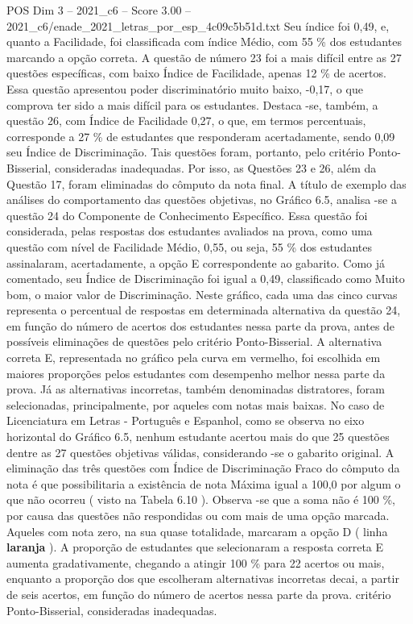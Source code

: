\begin{textsample}{POS Dim 3 – 2021\_c6 – Score 3.00 – 2021\_c6/enade\_2021\_letras\_por\_esp\_4c09c5b51d.txt}
Seu índice foi 0,49, e, quanto a Facilidade, foi classificada com índice Médio, com 55 \% dos estudantes marcando a opção correta.
A questão de número 23 foi a mais difícil entre as 27 questões específicas, com baixo Índice de Facilidade, apenas 12 \% de acertos.
Essa questão apresentou poder discriminatório muito baixo, -0,17, o que comprova ter sido a mais difícil para os estudantes.
Destaca -se, também, a questão 26, com Índice de Facilidade 0,27, o que, em termos percentuais, corresponde a 27 \% de estudantes que responderam acertadamente, sendo 0,09 seu Índice de Discriminação.
Tais questões foram, portanto, pelo critério Ponto-Bisserial, consideradas inadequadas.
Por isso, as Questões 23 e 26, além da Questão 17, foram eliminadas do cômputo da nota final.
A título de exemplo das análises do comportamento das questões objetivas, no Gráfico 6.5, analisa -se a questão 24 do Componente de Conhecimento Específico.
Essa questão foi considerada, pelas respostas dos estudantes avaliados na prova, como uma questão com nível de Facilidade Médio, 0,55, ou seja, 55 \% dos estudantes assinalaram, acertadamente, a opção E correspondente ao gabarito.
Como já comentado, seu Índice de Discriminação foi igual a 0,49, classificado como Muito bom, o maior valor de Discriminação.
Neste gráfico, cada uma das cinco curvas representa o percentual de respostas em determinada alternativa da questão 24, em função do número de acertos dos estudantes nessa parte da prova, antes de possíveis eliminações de questões pelo critério Ponto-Bisserial.
A alternativa correta E, representada no gráfico pela curva em vermelho, foi escolhida em maiores proporções pelos estudantes com desempenho melhor nessa parte da prova.
Já as alternativas incorretas, também denominadas distratores, foram selecionadas, principalmente, por aqueles com notas mais baixas.
No caso de Licenciatura em Letras - Português e Espanhol, como se observa no eixo horizontal do Gráfico 6.5, nenhum estudante acertou mais do que 25 questões dentre as 27 questões objetivas válidas, considerando -se o gabarito original.
A eliminação das três questões com Índice de Discriminação Fraco do cômputo da nota é que possibilitaria a existência de nota Máxima igual a 100,0 por algum o que não ocorreu ( visto na Tabela 6.10 ).
Observa -se que a soma não é 100 \%, por causa das questões não respondidas ou com mais de uma opção marcada.
Aqueles com nota zero, na sua quase totalidade, marcaram a opção D ( linha \textbf{laranja} ).
A proporção de estudantes que selecionaram a resposta correta E aumenta gradativamente, chegando a atingir 100 \% para 22 acertos ou mais, enquanto a proporção dos que escolheram alternativas incorretas decai, a partir de seis acertos, em função do número de acertos nessa parte da prova. critério Ponto-Bisserial, consideradas inadequadas.

\end{textsample}
